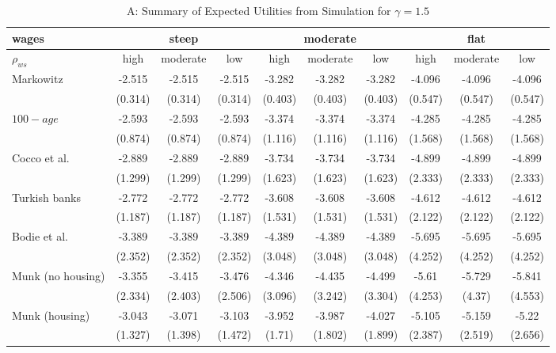 \documentclass[]{elsarticle}
\begin{document}
\begin{table}[h!]
	\centering
	\caption{A: Summary of Expected Utilities from Simulation for $\gamma=1.5$}
	\label{table:util}
	\begin{tabular}[c]{|l|ccc|ccc|ccc|}
		\hline
		 wages& \multicolumn{3}{c|}{steep} & \multicolumn{3}{c|}{moderate} & \multicolumn{3}{c|}{flat}\\
		\hline
		$\rho_{ws}$&high&moderate&low&high&moderate&low&high&moderate&low\\
		\hline
Markowitz					&-2.515&-2.515&-2.515&-3.282&-3.282&-3.282&-4.096&-4.096&-4.096\\
							&(0.314)&(0.314)&(0.314)&(0.403)&(0.403)&(0.403)&(0.547)&(0.547)&(0.547)\\
$100-age$					&-2.593&-2.593&-2.593&-3.374&-3.374&-3.374&-4.285&-4.285&-4.285\\
							&(0.874)&(0.874)&(0.874)&(1.116)&(1.116)&(1.116)&(1.568)&(1.568)&(1.568)\\
Cocco et al.				&-2.889&-2.889&-2.889&-3.734&-3.734&-3.734&-4.899&-4.899&-4.899\\
							&(1.299)&(1.299)&(1.299)&(1.623)&(1.623)&(1.623)&(2.333)&(2.333)&(2.333)\\
Turkish banks			 	&-2.772&-2.772&-2.772&-3.608&-3.608&-3.608&-4.612&-4.612&-4.612\\
							&(1.187)&(1.187)&(1.187)&(1.531)&(1.531)&(1.531)&(2.122)&(2.122)&(2.122)\\
Bodie et al.			 	&-3.389&-3.389&-3.389&-4.389&-4.389&-4.389&-5.695&-5.695&-5.695\\
							&(2.352)&(2.352)&(2.352)&(3.048)&(3.048)&(3.048)&(4.252)&(4.252)&(4.252)\\
Munk (no housing)			&-3.355&-3.415&-3.476&-4.346&-4.435&-4.499&-5.61&-5.729&-5.841\\
							&(2.334)&(2.403)&(2.506)&(3.096)&(3.242)&(3.304)&(4.253)&(4.37)&(4.553)\\
Munk (housing)				&-3.043&-3.071&-3.103&-3.952&-3.987&-4.027&-5.105&-5.159&-5.22\\
							&(1.327)&(1.398)&(1.472)&(1.71)&(1.802)&(1.899)&(2.387)&(2.519)&(2.656)\\
	\hline
	\end{tabular}
\end{table}
\end{document}
